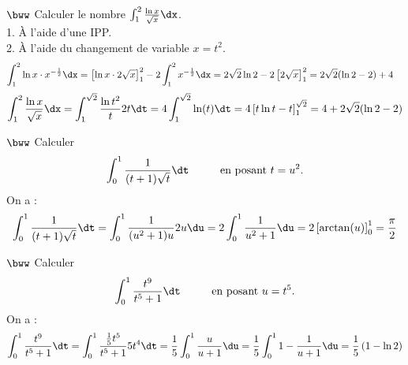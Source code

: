 \documentclass[11pt]{article}
\begin{document}
\begin{exercice}{$\bww$}{}
    Calculer le nombre $\int_1^2{\frac{\ln x}{\sqrt{x}}\dx}$.\\
    1. À l'aide d'une IPP.\\
    2. À l'aide du changement de variable $x=t^2$.
    \tcblower
    \begin{align*}
        \int_1^2{\ln x\cdot x^{-\frac{1}{2}} \dx}&=\left[\ln x \cdot 2\sqrt{x}\right]_1^2 - 2\int_1^2{x^{-\frac{1}{2}}\dx}=2\sqrt{2}\ln2-2\left[2\sqrt{x}\right]_1^2=2\sqrt{2}(\ln2-2)+4
    \end{align*}
    \begin{align*}
        \int_1^2{\frac{\ln x}{\sqrt{x}}\dx}=\int_1^{\sqrt{2}}{\frac{\ln t^2}{t}2t\dt}=4\int_1^{\sqrt{2}}{\ln(t)\dt}=4\left[t\ln t-t\right]_1^{\sqrt{2}}=4+2\sqrt{2}(\ln2-2)
    \end{align*}
\end{exercice}

\begin{exercice}{$\bww$}{}
    Calculer
    \begin{align*}
        \int_0^1{\frac{1}{(t+1)\sqrt{t}}\dt} \hspace{1cm} \text{en posant }t=u^2.
    \end{align*}
    \tcblower
    On a :
    \begin{align*}
       \int_0^1{\frac{1}{(t+1)\sqrt{t}}\dt} = \int_0^1{\frac{1}{(u^2+1)u}2u\du} = 2\int_0^1{\frac{1}{u^2+1}\du}=2\left[\arctan(u)\right]_0^1 = \frac{\pi}{2}
    \end{align*}
\end{exercice}

\begin{exercice}{$\bww$}{}
    Calculer
    \begin{align*}
        \int_0^1{\frac{t^9}{t^5+1}\dt} \hspace{1cm} \text{en posant } u=t^5.
    \end{align*}
    \tcblower
    On a :
    \begin{align*}
        \int_0^1{\frac{t^9}{t^5+1}\dt}=\int_0^1{\frac{\frac{1}{5}t^5}{t^5+1}5t^4\dt}=\frac{1}{5}\int^1_0{\frac{u}{u+1}\du}=\frac{1}{5}\int^1_0{1-\frac{1}{u+1}\du}=\frac{1}{5}\left(1-\ln2\right)
    \end{align*}
\end{exercice}
\end{document}
